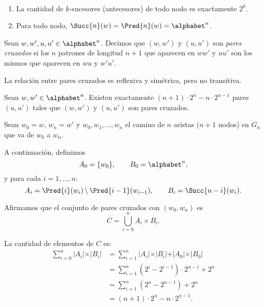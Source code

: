 \begin{obs}\ %
  \begin{enumerate}
    \item La cantidad de $k$-sucesores (antecesores) de todo nodo es
          exactamente $2^k$.
    \item Para todo nodo, $\Succ{n}(w) = \Pred{n}(w) = \alphabet^n$.
  \end{enumerate}
\end{obs}

\begin{defi}
  Sean $w,w',u,u' \in \alphabet^n$. Decimos que $(w,w')$ y $(u,u')$ son
  \emph{pares cruzados} si los $n$ patrones de longitud $n + 1$ que aparecen en
  $ww'$ y $uu'$ son los mismos que aparecen en $wu$ y $w'u'$.
\end{defi}

\begin{obs}
  La relación entre pares cruzados es reflexiva y simétrica, pero no
  transitiva.
\end{obs}

\begin{prop}
  Sean $w, w' \in \alphabet^n$. Existen exactamente $(n + 1) \cdot 2^n - n
    \cdot 2^{n - 1}$ pares $(u, u')$ tales que $(w, w')$ y $(u, u')$ son pares
  cruzados.
\end{prop}

\begin{demo}
  Sean $w_0 = w$, $w_n = w'$ y $w_0, w_1, \dots, w_n$ el camino de
  $n$ aristas ($n + 1$ nodos) en $G_n$ que va de $w_0$ a $w_n$.

  A continuación, definimos
  \[ A_0 = \lbrace w_0 \rbrace, \qquad
    B_0 = \alphabet^n, \]
  y para cada $i = 1, \dots, n$:
  \[ A_i = \Pred{i}(w_i) \,\backslash\, \Pred{i - 1}(w_{i - 1}), \qquad
    B_i = \Succ{n - i}(w_i). \]

  Afirmamos que el conjunto de pares cruzados con $(w_0, w_n)$ es
  \[ C = \bigcup_{i = 0}^n A_i \times B_i. \]

  La cantidad de elementos de $C$ es:
  \begin{align*}
    \sum_{i = 0}^n \vert A_i \vert \times \vert B_i \vert
     & = \sum_{i = 1}^n \vert A_i \vert \times \vert B_i \vert + \vert A_0
    \vert \times \vert B_0 \vert                                           \\
     & = \sum_{i = 1}^n \left( 2^{i} - 2^{i - 1} \right) \cdot 2^{n - i} +
    2^n                                                                    \\
     & = \sum_{i = 1}^n \left( 2^n - 2^{n - 1} \right) + 2^n               \\
     & = (n + 1) \cdot 2^n - n \cdot 2^{n - 1}.
  \end{align*}
\end{demo}
